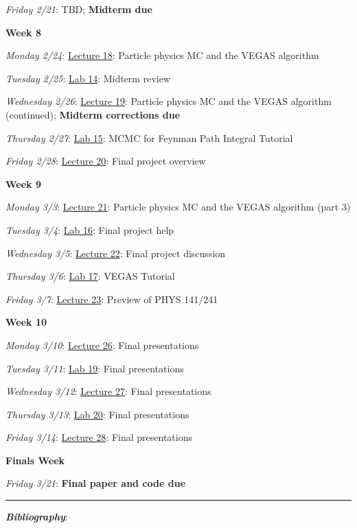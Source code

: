 \documentclass[12pt]{article}
\begin{document}
\emph{Friday 2/21}: TBD; \textbf{Midterm due}

\noindent\textbf{Week 8}

\emph{Monday 2/24}: \underline{Lecture 18}: Particle physics MC and the VEGAS algorithm

\emph{Tuesday 2/25}: \underline{Lab 14}: Midterm review

\emph{Wednesday 2/26}: \underline{Lecture 19}: Particle physics MC and the VEGAS algorithm (continued); \textbf{Midterm corrections due}

\emph{Thursday 2/27}: \underline{Lab 15}: MCMC for Feynman Path Integral Tutorial

\emph{Friday 2/28}: \underline{Lecture 20}: Final project overview

\noindent\textbf{Week 9}

\emph{Monday 3/3}: \underline{Lecture 21}: Particle physics MC and the VEGAS algorithm (part 3)

\emph{Tuesday 3/4}: \underline{Lab 16}: Final project help

\emph{Wednesday 3/5}: \underline{Lecture 22}: Final project discussion

\emph{Thursday 3/6}: \underline{Lab 17}: VEGAS Tutorial

\emph{Friday 3/7}: \underline{Lecture 23}: Preview of PHYS 141/241

\noindent\textbf{Week 10}

\emph{Monday 3/10}: \underline{Lecture 26}: Final presentations

\emph{Tuesday 3/11}: \underline{Lab 19}: Final presentations

\emph{Wednesday 3/12}: \underline{Lecture 27}: Final presentations

\emph{Thursday 3/13}: \underline{Lab 20}: Final presentations

\emph{Friday 3/14}: \underline{Lecture 28}: Final presentations

\noindent\textbf{Finals Week}

\emph{Friday 3/21}: \textbf{Final paper and code due}

\begin{center}
  \rule{\textwidth}{0.5pt}
\end{center}
\nocite{*}

\noindent\textbf{\emph{Bibliography}}:\\
\printbibliography[heading=none]
\end{document}
